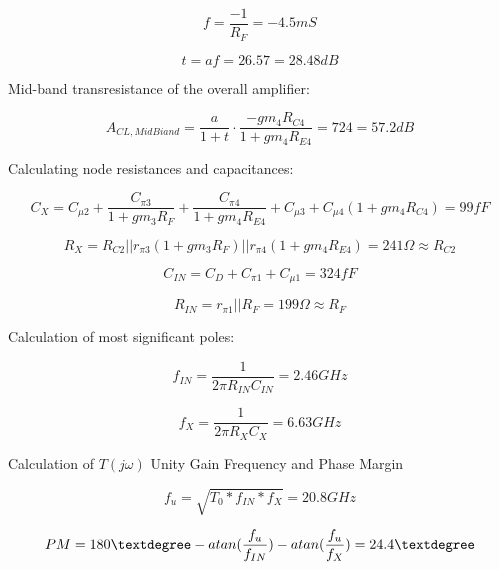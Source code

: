 \documentclass[12pt,a4paper]{article}
\begin{document}
\begin{equation}
  f = \frac{-1}{R_F} = -4.5mS
\end{equation}

\begin{equation}
  t = a f = 26.57 = 28.48dB
\end{equation}

Mid-band transresistance of the overall amplifier:

\begin{equation}
  A_{CL, MidBiand} = \frac{a}{1 + t} \cdot \frac{-gm_4 R_{C4}}{1 + gm_4 R_{E4}} = 724 = 57.2dB
\end{equation}

Calculating node resistances and capacitances:

\begin{equation}
  C_X = C_{\mu 2} + \frac{C_{\pi 3}}{1 + gm_3 R_F} + \frac{C_{\pi 4}}{1+gm_4 R_{E4}} + C_{\mu 3} + C_{\mu 4} (1 + gm_4 R_{C4}) = 99fF
\end{equation}

\begin{equation}
  R_X = R_{C2} || r_{\pi 3}(1+gm_3 R_F) || r_{\pi4}(1+gm_4 R_{E4}) = 241\Omega \approx R_{C2}
\end{equation}

\begin{equation}
  C_{IN} = C_D + C_{\pi1} + C_{\mu1} = 324fF
\end{equation}

\begin{equation}
  R_{IN} = r_{\pi1} || R_F = 199\Omega \approx R_F
\end{equation}

Calculation of most significant poles:

\begin{equation}
  f_{IN} = \frac{1}{2 \pi R_{IN} C_{IN}} = 2.46GHz
\end{equation}

\begin{equation}
  f_{X} = \frac{1}{2 \pi R_{X} C_{X}} = 6.63GHz
\end{equation}

Calculation of $T(j\omega)$ Unity Gain Frequency and Phase Margin

\begin{equation}
  f_{u} = \sqrt{T_0 * f_{IN} * f_{X}} = 20.8GHz
\end{equation}

\begin{equation}
  PM = 180\textdegree  - atan(\frac{f_u}{f_{IN}}) - atan(\frac{f_u}{f_{X}}) = 24.4\textdegree
\end{equation}
\end{document}
